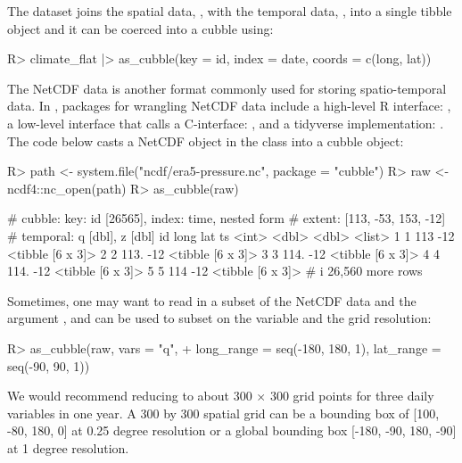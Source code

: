 \documentclass[
  shortnames]{jss}
\begin{document}
The dataset  joins the spatial data, , with the temporal data, , into a single tibble object and it can be coerced into a cubble using:

\begin{CodeChunk}
\begin{CodeInput}
R> climate_flat |> as_cubble(key = id, index = date, coords = c(long, lat))
\end{CodeInput}
\end{CodeChunk}

The NetCDF data is another format commonly used for storing spatio-temporal data. In , packages for wrangling NetCDF data include a high-level R interface:  \citep{ncdf4}, a low-level interface that calls a C-interface:  \citep{rnetcdf}, and a tidyverse implementation:  \citep{tidync}. The code below casts a NetCDF object in the  class into a cubble object:

\begin{CodeChunk}
\begin{CodeInput}
R> path <- system.file("ncdf/era5-pressure.nc", package = "cubble")
R> raw <- ncdf4::nc_open(path)
R> as_cubble(raw)
\end{CodeInput}
\begin{CodeOutput}
# cubble:   key: id [26565], index: time, nested form
# extent:   [113, -53, 153, -12]
# temporal: q [dbl], z [dbl]
     id  long   lat ts              
  <int> <dbl> <dbl> <list>          
1     1  113    -12 <tibble [6 x 3]>
2     2  113.   -12 <tibble [6 x 3]>
3     3  114.   -12 <tibble [6 x 3]>
4     4  114.   -12 <tibble [6 x 3]>
5     5  114    -12 <tibble [6 x 3]>
# i 26,560 more rows
\end{CodeOutput}
\end{CodeChunk}

Sometimes, one may want to read in a subset of the NetCDF data and the argument ,  and  can be used to subset on the variable and the grid resolution:

\begin{CodeChunk}
\begin{CodeInput}
R> as_cubble(raw, vars = "q",
+           long_range = seq(-180, 180, 1), lat_range = seq(-90, 90, 1))
\end{CodeInput}
\end{CodeChunk}

We would recommend reducing to about 300 \(\times\) 300 grid points for three daily variables in one year. A 300 by 300 spatial grid can be a bounding box of {[}100, -80, 180, 0{]} at 0.25 degree resolution or a global bounding box {[}-180, -90, 180, -90{]} at 1 degree resolution.
\end{document}
